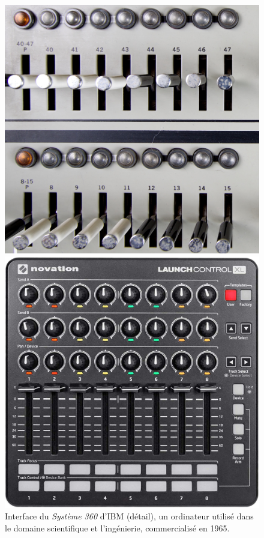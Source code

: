 \begin{figure}[!htbp]
	\captionsetup{format=plain}%
	\centering
	\begin{minipage}[t]{0.48\textwidth}
		\includegraphics[width=\linewidth]{gfx/05_interfaces/IBM_System_360_Panel.jpg}
		\caption[L'interface du système 360 d'IBM]{Interface du\textit{ Système 360} d'IBM (détail), un ordinateur utilisé dans le domaine scientifique et l'ingénierie, commercialisé en 1965.}
		\label{fig:interface:ibm360}
	\end{minipage}
	\hspace{.02\linewidth}
	\begin{minipage}[t]{0.48\textwidth}
	    \includegraphics[width=\linewidth]{gfx/05_interfaces/NovationLaunchControlXL.jpg}

\end{minipage}
\end{figure}
